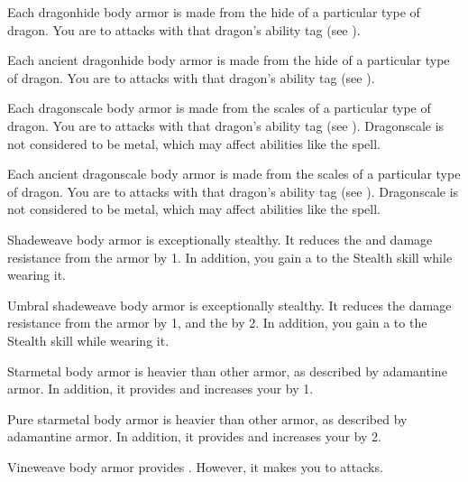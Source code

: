        Each dragonhide body armor is made from the hide of a particular type of dragon.
      You are  to attacks with that dragon's ability tag (see ).

       Each ancient dragonhide body armor is made from the hide of a particular type of dragon.
      You are  to attacks with that dragon's ability tag (see ).

       Each dragonscale body armor is made from the scales of a particular type of dragon.
      You are  to attacks with that dragon's ability tag (see ).
      Dragonscale is not considered to be metal, which may affect abilities like the  spell.

       Each ancient dragonscale body armor is made from the scales of a particular type of dragon.
      You are  to attacks with that dragon's ability tag (see ).
      Dragonscale is not considered to be metal, which may affect abilities like the  spell.

       Shadeweave body armor is exceptionally stealthy.
      It reduces the  and damage resistance from the armor by 1.
      In addition, you gain a   to the Stealth skill while wearing it.

       Umbral shadeweave body armor is exceptionally stealthy.
      It reduces the damage resistance from the armor by 1, and the  by 2.
      In addition, you gain a   to the Stealth skill while wearing it.

       Starmetal body armor is heavier than other armor, as described by adamantine armor.
      In addition, it provides   and increases your  by 1.

       Pure starmetal body armor is heavier than other armor, as described by adamantine armor.
      In addition, it provides   and increases your  by 2.

       Vineweave body armor provides  .
      However, it makes you \vulnerable to \atFire attacks.

